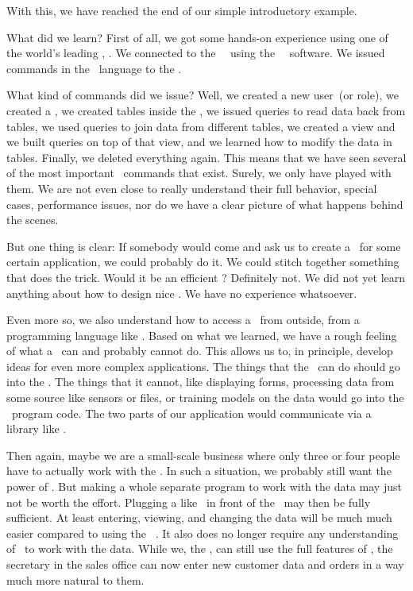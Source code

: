 %
%
%
With this, we have reached the end of our simple introductory example.

What did we learn?
First of all, we got some hands-on experience using one of the world's leading \dbms, \postgresql.
We connected to the \postgresql\ \server\ using the \psql\ \client\ software.
We issued commands in the \sql\ language to the \dbms.

What kind of commands did we issue?
Well, we created a new user~(or role), we created a \db, we created tables inside the \db, we issued queries to read data back from tables, we used queries to join data from different tables, we created a view and we built queries on top of that view, and we learned how to modify the data in tables.
Finally, we deleted everything again.
This means that we have seen several of the most important \sql\ commands that exist.
Surely, we only have played with them.
We are not even close to really understand their full behavior, special cases, performance issues, nor do we have a clear picture of what happens behind the scenes.

But one thing is clear:
If somebody would come and ask us to create a \db\ for some certain application, we could probably do it.
We could stitch together something that does the trick.
Would it be an efficient \db?
Definitely not.
We did not yet learn anything about how to design nice .
We have no experience whatsoever.

Even more so, we also understand how to access a \db\ from outside, from a programming language like \python.
Based on what we learned, we have a rough feeling of what a \dbms\ can and probably cannot do.
This allows us to, in principle, develop ideas for even more complex applications.
The things that the \dbms\ can do should go into the \db.
The things that it cannot, like displaying forms, processing data from some source like sensors or files, or training  models on the data would go into the \python\ program code.
The two parts of our application would communicate via a library like \psycopg.

Then again, maybe we are a small-scale business where only three or four people have to actually work with the \db.
In such a situation, we probably still want the power of \postgresql.
But making a whole separate program to work with the data may just not be worth the effort.
Plugging a  like \libreofficeBase\ in front of the \db\ may then be fully sufficient.
At least entering, viewing, and changing the data will be much much easier compared to using the \psql\ \client.
It also does no longer require any understanding of \sql\ to work with the data.
While we, the , can still use the full features of \postgresql, the secretary in the sales office can now enter new customer data and orders in a way much more natural to them.

